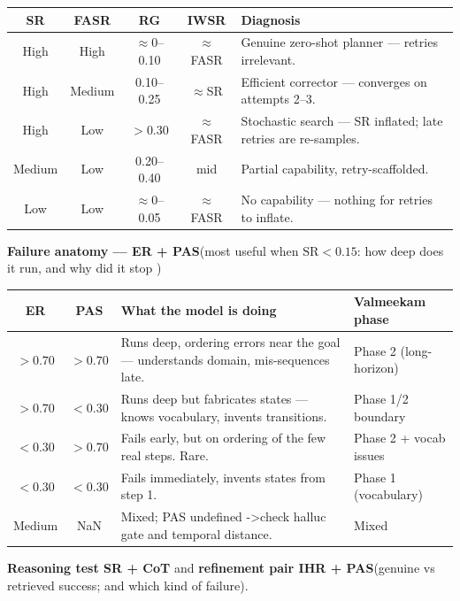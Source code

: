 \begin{table}[h]\small
\centering
\begin{tabularx}{\linewidth}{@{}C C C C Y@{}}
\toprule
SR & FASR & RG & IWSR & Diagnosis\\
\midrule
High & High & \(\approx\)0--0.10 & \(\approx\)FASR & Genuine zero-shot planner --- retries irrelevant.\\
\addlinespace
High & Medium & 0.10--0.25 & \(\approx\)SR & Efficient corrector --- converges on attempts 2--3.\\
\addlinespace
High & Low & \(>0.30\) & \(\approx\)FASR & Stochastic search --- SR inflated; late retries are re-samples.\\
\addlinespace
Medium & Low & 0.20--0.40 & mid & Partial capability, retry-scaffolded.\\
\addlinespace
Low & Low & \(\approx\)0--0.05 & \(\approx\)FASR & No capability --- nothing for retries to inflate.\\
\bottomrule
\end{tabularx}
\end{table}

\textbf{Failure anatomy --- ER + PAS}(most useful when \(\mathrm{SR}<0.15\): how deep does it run, and why did it stop )

\begin{table}[h]\small
\centering
\begin{tabularx}{\linewidth}{@{}C C I P@{}}
\toprule
ER & PAS & What the model is doing & Valmeekam phase\\
\midrule
\(>0.70\) & \(>0.70\) & Runs deep, ordering errors near the goal --- understands domain, mis-sequences late. & Phase 2 (long-horizon)\\
\addlinespace
\(>0.70\) & \(<0.30\) & Runs deep but fabricates states --- knows vocabulary, invents transitions. & Phase 1/2 boundary\\
\addlinespace
\(<0.30\) & \(>0.70\) & Fails early, but on ordering of the few real steps. Rare. & Phase 2 + vocab issues\\
\addlinespace
\(<0.30\) & \(<0.30\) & Fails immediately, invents states from step 1. & Phase 1 (vocabulary)\\
\addlinespace
Medium & NaN & Mixed; PAS undefined ->check halluc gate and temporal distance. & Mixed\\
\bottomrule
\end{tabularx}
\end{table}

\textbf{Reasoning test SR + CoT} and \textbf{refinement pair IHR + PAS}(genuine vs retrieved success; and which kind of failure).

